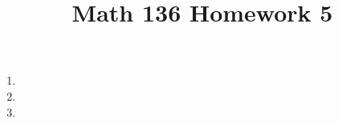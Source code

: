 \documentclass{article}
\title{Math 136 Homework 5}
\begin{document}
    \maketitle
    \begin{enumerate}
      \item 
      \item 
      \item 
    \end{enumerate}
\end{document}
